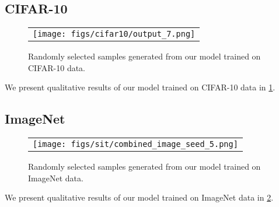 \subsection{CIFAR-10}
\label{app:qual_cifar10}

\begin{figure}[t]
    \centering
    \begin{tabular}{c}
    \texttt{[image: figs/cifar10/output\_7.png]} \\
    \end{tabular}
    \caption{Randomly selected samples generated from our model trained on CIFAR-10 data. }
    \label{fig:cifar10_qual}
\end{figure}

We present  qualitative results of our model trained on  CIFAR-10 data in \cref{fig:cifar10_qual}. 



\subsection{ImageNet}
\label{app:qual_imagenet}

\begin{figure}[t]
    \centering
    \begin{tabular}{c}
    \texttt{[image: figs/sit/combined\_image\_seed\_5.png]} \\
    \end{tabular}
    \caption{Randomly selected samples generated from our model trained on ImageNet data. }
    \label{fig:imagenet_qual}
\end{figure}

We present  qualitative results of our model trained on  ImageNet data in \cref{fig:imagenet_qual}. 
